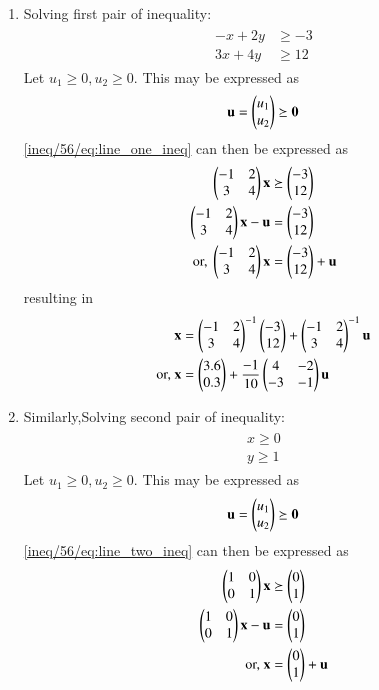 
\begin{enumerate}
    \item Solving first pair of inequality:
    \begin{align}
\label{ineq/56/eq:line_one_ineq}
\begin{split}
    -x+2y &\geq -3
\\
    3x+4y &\geq 12
\end{split}
\end{align}
\solution  Let $u_1 \ge 0, u_2 \ge 0$.  This may be expressed as
\begin{align}
\mathbf{u} = \begin{pmatrix}u_1\\u_2\end{pmatrix}\succeq \mathbf{0}
\end{align}
%
\eqref{ineq/56/eq:line_one_ineq} can then be expressed as
\begin{align}
\begin{pmatrix}-1 & 2 \\ 3 & 4\end{pmatrix}\mathbf{x}  &\succeq \begin{pmatrix}-3\\12\end{pmatrix}
\\
\begin{pmatrix}-1 & 2 \\ 3 & 4\end{pmatrix}\mathbf{x}  -\mathbf{u}&=\begin{pmatrix}-3\\12\end{pmatrix}
\\
\text{or, }
\begin{pmatrix}-1 & 2 \\ 3 & 4\end{pmatrix}\mathbf{x} &= \begin{pmatrix}-3\\12\end{pmatrix} +\mathbf{u}
\end{align}
%
resulting in 
\begin{align}
\mathbf{x} &= \begin{pmatrix}-1 & 2 \\ 3 & 4\end{pmatrix}^{-1}\begin{pmatrix}-3\\12\end{pmatrix} +\begin{pmatrix}-1 & 2 \\ 3 & 4\end{pmatrix}^{-1}\mathbf{u}
\\
\text{or, } \mathbf{x} &= \begin{pmatrix}3.6\\0.3\end{pmatrix} +\frac{-1}{10}\begin{pmatrix}4 & -2 \\ -3 & -1\end{pmatrix}\mathbf{u}\label{ineq/56/eq:1}
\end{align}
    
    \item Similarly,Solving second pair of inequality:
    \begin{align}
\label{ineq/56/eq:line_two_ineq}
\begin{split}
    x\geq 0
\\
    y \geq 1
\end{split}
\end{align}
\solution  Let $u_1 \ge 0, u_2 \ge 0$.  This may be expressed as
\begin{align}
\mathbf{u} = \begin{pmatrix}u_1\\u_2\end{pmatrix}\succeq \mathbf{0}
\end{align}
%
\eqref{ineq/56/eq:line_two_ineq} can then be expressed as
\begin{align}
\begin{pmatrix}1 & 0 \\ 0 & 1\end{pmatrix}\mathbf{x}  &\succeq \begin{pmatrix}0\\1\end{pmatrix}
\\
\begin{pmatrix}1 & 0 \\ 0 & 1\end{pmatrix}\mathbf{x}  -\mathbf{u}&=\begin{pmatrix}0\\1\end{pmatrix}
\\
\text{or, }
\mathbf{x} &= \begin{pmatrix}0\\1\end{pmatrix} +\mathbf{u}\label{ineq/56/eq:2}
\end{align}
\end{enumerate}
